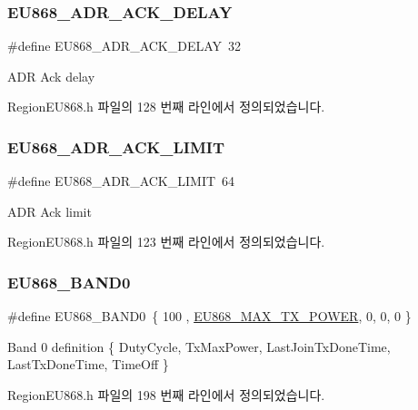 \subsubsection{\texorpdfstring{E\+U868\+\_\+\+A\+D\+R\+\_\+\+A\+C\+K\+\_\+\+D\+E\+L\+AY}{EU868\_ADR\_ACK\_DELAY}}
{\footnotesize\ttfamily \#define E\+U868\+\_\+\+A\+D\+R\+\_\+\+A\+C\+K\+\_\+\+D\+E\+L\+AY~32}

A\+DR Ack delay 

Region\+E\+U868.\+h 파일의 128 번째 라인에서 정의되었습니다.

\mbox{\label{group___r_e_g_i_o_n_e_u868_ga67c54d4a8b30d30138dd013779f72cdf}} 
\subsubsection{\texorpdfstring{E\+U868\+\_\+\+A\+D\+R\+\_\+\+A\+C\+K\+\_\+\+L\+I\+M\+IT}{EU868\_ADR\_ACK\_LIMIT}}
{\footnotesize\ttfamily \#define E\+U868\+\_\+\+A\+D\+R\+\_\+\+A\+C\+K\+\_\+\+L\+I\+M\+IT~64}

A\+DR Ack limit 

Region\+E\+U868.\+h 파일의 123 번째 라인에서 정의되었습니다.

\mbox{\label{group___r_e_g_i_o_n_e_u868_gadf9e5ce0c5061df64ab9105bba178fb5}} 
\subsubsection{\texorpdfstring{E\+U868\+\_\+\+B\+A\+N\+D0}{EU868\_BAND0}}
{\footnotesize\ttfamily \#define E\+U868\+\_\+\+B\+A\+N\+D0~\{ 100 , \mbox{\hyperlink{group___r_e_g_i_o_n_e_u868_ga39e338c7f8454f594302811f61d9560d}{E\+U868\+\_\+\+M\+A\+X\+\_\+\+T\+X\+\_\+\+P\+O\+W\+ER}}, 0, 0, 0 \}}

Band 0 definition \{ Duty\+Cycle, Tx\+Max\+Power, Last\+Join\+Tx\+Done\+Time, Last\+Tx\+Done\+Time, Time\+Off \} 

Region\+E\+U868.\+h 파일의 198 번째 라인에서 정의되었습니다.

